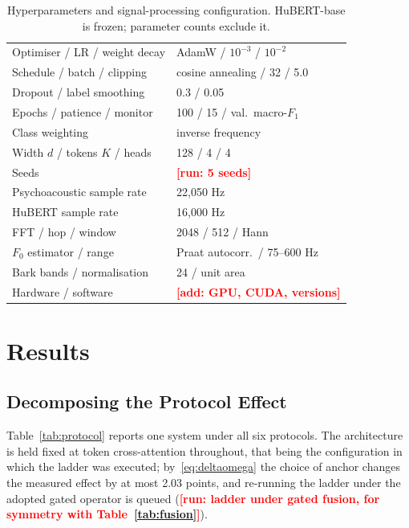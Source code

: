 \documentclass[journal,onecolumn,11pt,draftclsnofoot]{IEEEtran}   %
\newcommand{\TORUN}[1]{\textcolor{red}{\textbf{[run: #1]}}}
\newcommand{\TOADD}[1]{\textcolor{red}{\textbf{[add: #1]}}}
\newcommand{\TORUN}[1]{}
\newcommand{\TOADD}[1]{\textcolor{gray}{[#1]}}
\begin{document}
\begin{table}[!t]
\centering\small
\caption{Hyperparameters and signal-processing configuration. HuBERT-base is
frozen; parameter counts exclude it.}
\label{tab:hyper}
\begin{tabular}{@{}ll@{}}
\toprule
Optimiser / LR / weight decay & AdamW / $10^{-3}$ / $10^{-2}$ \\
Schedule / batch / clipping   & cosine annealing / 32 / 5.0 \\
Dropout / label smoothing     & 0.3 / 0.05 \\
Epochs / patience / monitor   & 100 / 15 / val.\ macro-$F_1$ \\
Class weighting               & inverse frequency \\
Width $d$ / tokens $K$ / heads & 128 / 4 / 4 \\
Seeds                         & \TORUN{5 seeds} \\
\midrule
Psychoacoustic sample rate    & 22{,}050 Hz \\
HuBERT sample rate            & 16{,}000 Hz \\
FFT / hop / window            & 2048 / 512 / Hann \\
$F_0$ estimator / range       & Praat autocorr.\ / 75--600 Hz \\
Bark bands / normalisation    & 24 / unit area \\
\midrule
Hardware / software           & \TOADD{GPU, CUDA, versions} \\
\bottomrule
\end{tabular}
\end{table}

\section{Results}
\label{sec:results}

\subsection{Decomposing the Protocol Effect}
\label{sec:protocol}
Table~\ref{tab:protocol} reports one system under all six protocols. The
architecture is held fixed at token cross-attention throughout, that being the
configuration in which the ladder was executed; by~\eqref{eq:deltaomega} the
choice of anchor changes the measured effect by at most 2.03 points, and
re-running the ladder under the adopted gated operator is queued
(\TORUN{ladder under gated fusion, for symmetry with Table~\ref{tab:fusion}}).
\end{document}
